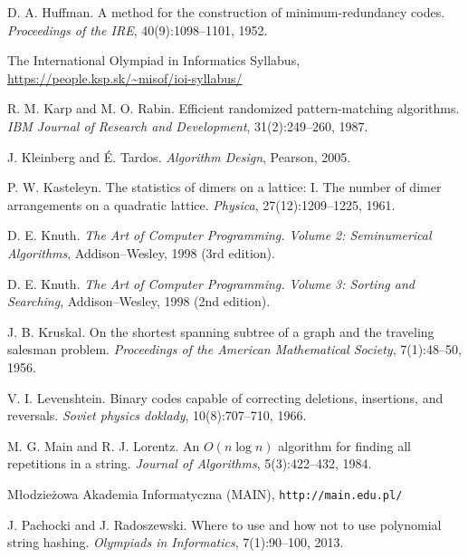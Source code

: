 \begin{thebibliography}{9}
  D. A. Huffman.
  A method for the construction of minimum-redundancy codes.
  \emph{Proceedings of the IRE}, 40(9):1098--1101, 1952.

  The International Olympiad in Informatics Syllabus,
  \url{https://people.ksp.sk/~misof/ioi-syllabus/}

  R. M. Karp and M. O. Rabin.
  Efficient randomized pattern-matching algorithms.
  \emph{IBM Journal of Research and Development}, 31(2):249--260, 1987.

  J. Kleinberg and É. Tardos.
  \emph{Algorithm Design}, Pearson, 2005.

  P. W. Kasteleyn.  
  The statistics of dimers on a lattice: I. The number of dimer arrangements on a quadratic lattice.
  \emph{Physica}, 27(12):1209--1225, 1961.

  D. E. Knuth.
  \emph{The Art of Computer Programming. Volume 2: Seminumerical Algorithms}, Addison–Wesley, 1998 (3rd edition).

  D. E. Knuth.
  \emph{The Art of Computer Programming. Volume 3: Sorting and Searching}, Addison–Wesley, 1998 (2nd edition).


  J. B. Kruskal.
  On the shortest spanning subtree of a graph and the traveling salesman problem.
  \emph{Proceedings of the American Mathematical Society}, 7(1):48--50, 1956.

  V. I. Levenshtein.
  Binary codes capable of correcting deletions, insertions, and reversals.
  \emph{Soviet physics doklady}, 10(8):707--710, 1966.

  M. G. Main and R. J. Lorentz.
  An $O(n \log n)$ algorithm for finding all repetitions in a string.
  \emph{Journal of Algorithms}, 5(3):422--432, 1984.

  Młodzieżowa Akademia Informatyczna (MAIN), \texttt{http://main.edu.pl/}


  J. Pachocki and J. Radoszewski.
  Where to use and how not to use polynomial string hashing.
  \emph{Olympiads in Informatics}, 7(1):90--100, 2013.


\end{thebibliography}
